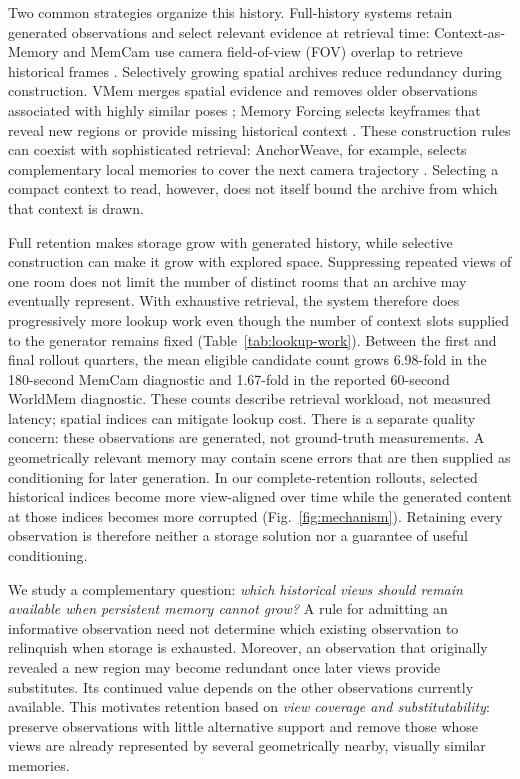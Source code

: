 \documentclass[10pt,twocolumn]{article}
\begin{document}
Two common strategies organize this history. Full-history systems retain
generated observations and select relevant evidence at retrieval time:
Context-as-Memory and MemCam use camera field-of-view (FOV) overlap to retrieve
historical frames \citep{contextasmemory,memcam}. Selectively growing spatial
archives reduce redundancy during construction. VMem merges spatial evidence
and removes older observations associated with highly similar poses
\citep{vmem}; Memory Forcing selects keyframes that reveal new regions or
provide missing historical context \citep{memoryforcing}. These construction
rules can coexist with sophisticated retrieval: AnchorWeave, for example,
selects complementary local memories to cover the next camera trajectory
\citep{anchorweave}. Selecting a compact context to read, however, does not
itself bound the archive from which that context is drawn.

Full retention makes storage grow with generated history, while selective
construction can make it grow with explored space. Suppressing repeated views
of one room does not limit the number of distinct rooms that an archive may
eventually represent. With exhaustive retrieval, the system therefore does
progressively more lookup work even though the number of context slots supplied
to the generator remains fixed (Table~\ref{tab:lookup-work}). Between the first
and final rollout quarters, the mean eligible candidate count grows
6.98-fold in the 180-second MemCam diagnostic and 1.67-fold in the reported
60-second WorldMem diagnostic. These counts describe retrieval workload,
not measured latency; spatial indices can mitigate lookup cost.
There is a separate quality concern: these observations are generated, not
ground-truth measurements. A geometrically relevant memory may contain scene
errors that are then supplied as conditioning for later generation. In our
complete-retention rollouts, selected historical indices become more
view-aligned over time while the generated content at those indices becomes
more corrupted (Fig.~\ref{fig:mechanism}). Retaining every observation is
therefore neither a storage solution nor a guarantee of useful conditioning.



We study a complementary question: \emph{which historical views should remain
available when persistent memory cannot grow?} A rule for admitting an
informative observation need not determine which existing observation to
relinquish when storage is exhausted. Moreover, an observation that originally
revealed a new region may become redundant once later views provide
substitutes. Its continued value depends on the other observations currently
available. This motivates retention based on \emph{view coverage and
substitutability}: preserve observations with little alternative support and
remove those whose views are already represented by several geometrically
nearby, visually similar memories.
\end{document}

